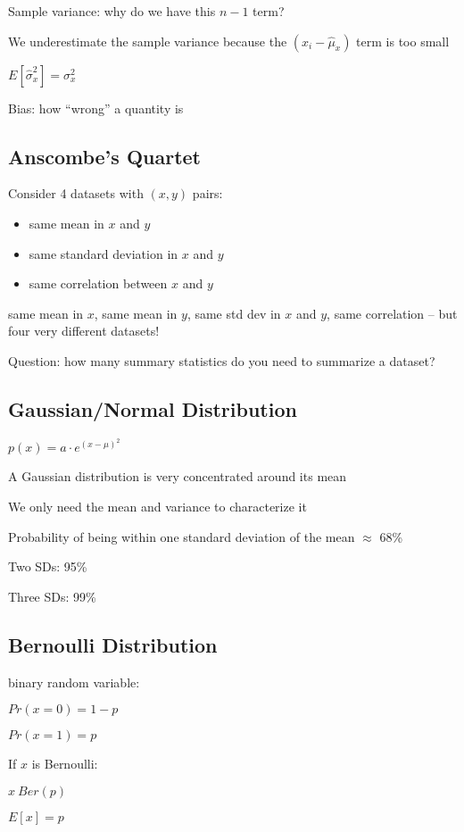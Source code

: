 \documentclass[twoside]{article}
\begin{document}
Sample variance: why do we have this $n-1$ term?

We underestimate the sample variance because the $(x_i - \hat{\mu}_x)$ term is too small

$E[\hat{\sigma}_x^2] = \sigma_x^2$

Bias: how ``wrong'' a quantity is

\subsection{Anscombe's Quartet}

Consider 4 datasets with $(x,y)$ pairs:
\begin{itemize}
\item same mean in $x$ and $y$
\item same standard deviation in $x$ and $y$
\item same correlation between $x$ and $y$ 
\end{itemize}

same mean in $x$, same mean in $y$, same std dev in $x$ and $y$, same correlation -- but four very different datasets!

Question: how many summary statistics do you need to summarize a dataset?

\subsection{Gaussian/Normal Distribution}

$p(x) = a \cdot e^{(x-\mu)^2}$

A Gaussian distribution is very concentrated around its mean

We only need the mean and variance to characterize it

Probability of being within one standard deviation of the mean $\approx$ 68\%

Two SDs: 95\%

Three SDs: 99\%

\subsection{Bernoulli Distribution}

binary random variable:

$Pr(x=0) = 1-p$

$Pr(x=1) = p$ 

If $x$ is Bernoulli: 

$x ~ Ber(p)$

$E[x] = p$
\end{document}
